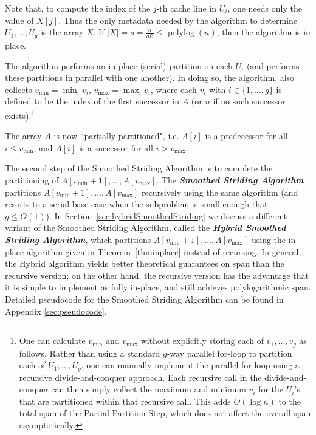 \documentclass[a4paper,UKenglish,cleveref, autoref, thm-restate]{lipics-v2019}
\DeclareMathOperator{\polylog}{\text{polylog}}
\newcommand{\defn}[1]{{\textit{\textbf{\boldmath #1}}}}
\begin{document}
Note that, to compute the index of the $j$-th cache line in $U_i$,
one needs only the value of $X[j]$. Thus the only metadata needed by
the algorithm to determine $U_1, \ldots, U_g$ is the array
$X$. If $|X| = s = \frac{n}{gB} \le \polylog(n)$, then
the algorithm is in place.
  
The algorithm performs an in-place (serial) partition on each
$U_i$ (and performs these partitions in parallel with one
another). In doing so, the algorithm, also collects
$v_{\text{min}}=\min_i{v_i}$, $v_{\text{max}}=\max_i{v_i}$, where
each $v_i$ with $i \in \{1, \ldots, g\}$ is defined to be the index
of the first successor in $A$ (or $n$ if no such successor
exists).\footnote{One can calculate $v_{\text{min}}$ and
  $v_{\text{max}}$ without explicitly storing each of $v_1, \ldots,
  v_{g}$ as follows. Rather than using a standard $g$-way parallel
  for-loop to partition each of $U_1, \ldots, U_{g}$, one can
  manually implement the parallel for-loop using a recursive
  divide-and-conquer approach. Each recursive call in the
  divide-and-conquer can then simply collect the maximum and minimum
  $v_i$ for the $U_i$'s that are partitioned within that recursive
  call. This adds $O(\log n)$ to the total span of the Partial
  Partition Step, which does not affect the overall span
  asymptotically.
}

The array $A$ is now ``partially partitioned", i.e. $A[i]$ is a
predecessor for all $i \le v_{\text{min}}$, and $A[i]$ is a successor
for all $i > v_{\text{max}}$.

The second step of the Smoothed Striding Algorithm is to complete
the partitioning of $A[v_{\text{min}} + 1], \ldots,
A[v_{\text{max}}]$. The \defn{Smoothed Striding
Algorithm} partitions $A[v_{\text{min}} + 1], \ldots,
A[v_{\text{max}}]$ recursively using the same algorithm (and
resorts to a serial base case when the subproblem is small enough
that $g \le O(1)$). In Section~\ref{sec:hybridSmoothedStriding}
we discuss a different variant of the Smoothed Striding
Algorithm, called the \defn{Hybrid Smoothed Striding Algorithm},
which partitions $A[v_{\text{min}} + 1], \ldots,
A[v_{\text{max}}]$ using the in-place algorithm given in
Theorem~\ref{thminplace} instead of recursing. In general, the
Hybrid algorithm yields better theoretical guarantees on span
than the recursive version; on the other hand, the recursive
version has the advantage that it is simple to implement as fully
in-place, and still achieves polylogarithmic span. Detailed
pseudocode for the Smoothed Striding Algorithm can be
found in Appendix \ref{sec:pseudocode}. 
\end{document}
